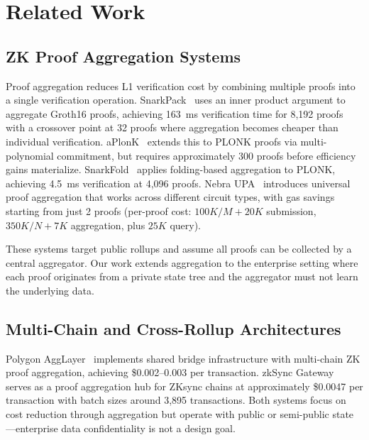 
\section{Related Work}

\subsection{ZK Proof Aggregation Systems}

Proof aggregation reduces L1 verification cost by combining multiple proofs
into a single verification operation. SnarkPack~\cite{gailly2022snarkpack}
uses an inner product argument to aggregate Groth16 proofs, achieving 163~ms
verification time for 8,192 proofs with a crossover point at 32 proofs where
aggregation becomes cheaper than individual verification.
aPlonK~\cite{zapico2022aplonk} extends this to PLONK proofs via
multi-polynomial commitment, but requires approximately 300 proofs before
efficiency gains materialize. SnarkFold~\cite{ozdemir2023snarkfold} applies
folding-based aggregation to PLONK, achieving 4.5~ms verification at 4,096
proofs. Nebra UPA~\cite{nebra2024upa} introduces universal proof aggregation
that works across different circuit types, with gas savings starting from just
2 proofs (per-proof cost: $100K/M + 20K$ submission, $350K/N + 7K$
aggregation, plus $25K$ query).

These systems target public rollups and assume all proofs can be collected by
a central aggregator. Our work extends aggregation to the enterprise setting
where each proof originates from a private state tree and the aggregator must
not learn the underlying data.

\subsection{Multi-Chain and Cross-Rollup Architectures}

Polygon AggLayer~\cite{polygon2025agglayer} implements shared bridge
infrastructure with multi-chain ZK proof aggregation, achieving
\$0.002--0.003 per transaction. zkSync Gateway~\cite{zksync2025gateway}
serves as a proof aggregation hub for ZKsync chains at approximately
\$0.0047 per transaction with batch sizes around 3,895 transactions. Both
systems focus on cost reduction through aggregation but operate with public
or semi-public state---enterprise data confidentiality is not a design goal.

